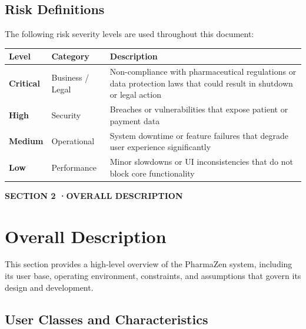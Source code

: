 \documentclass[12pt, a4paper]{article}
\newcommand{\sectionbadge}[2]{%
  \vspace{12pt}
  \noindent
  \colorbox{pharmagreen}{%
    \parbox{\dimexpr\textwidth-2\fboxsep\relax}{%
      \vspace{4pt}
      \color{white}\small\bfseries\MakeUppercase{SECTION #1 \quad·\quad #2}
      \vspace{4pt}
    }%
  }
  \vspace{6pt}
}
\begin{document}
\subsection{Risk Definitions}

The following risk severity levels are used throughout this document:

\vspace{8pt}
\renewcommand{\arraystretch}{1.5}
\begin{tabular}{|L{2.2cm}|L{3cm}|L{9.8cm}|}
  \hline
  \textbf{\color{white}Level} & \textbf{\color{white}Category} & \textbf{\color{white}Description} \\
  \hline
  \textcolor{priorityhigh}{\textbf{Critical}} & Business / Legal & Non-compliance with pharmaceutical regulations or data protection laws that could result in shutdown or legal action \\
  \hline
  \textcolor{priorityhigh}{\textbf{High}} & Security & Breaches or vulnerabilities that expose patient or payment data \\
  \hline
  \textcolor{prioritymed}{\textbf{Medium}} & Operational & System downtime or feature failures that degrade user experience significantly \\
  \hline
  \textcolor{prioritylow}{\textbf{Low}} & Performance & Minor slowdowns or UI inconsistencies that do not block core functionality \\
  \hline
\end{tabular}

\newpage

\sectionbadge{2}{Overall Description}
\section{Overall Description}

This section provides a high-level overview of the PharmaZen system, including its user base, operating environment, constraints, and assumptions that govern its design and development.

\subsection{User Classes and Characteristics}
\end{document}
